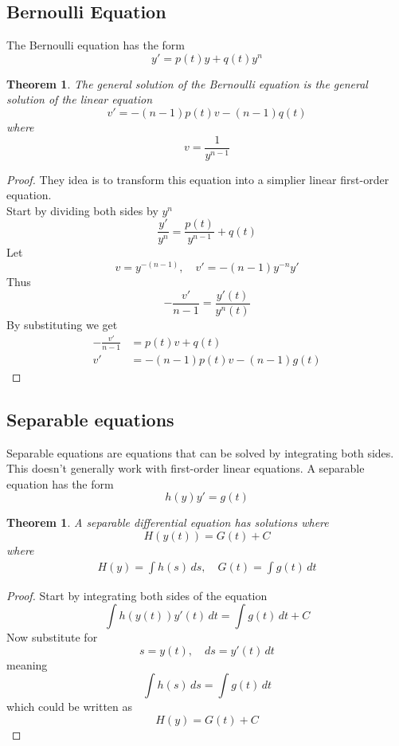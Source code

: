 \documentclass{article}
\newtheorem*{theorem5}{Theorem}
\newtheorem*{theorem6}{Theorem}
\begin{document}
\pagebreak

\subsection{Bernoulli Equation}

The Bernoulli equation has the form
\[
    y' = p(t)y + q(t)y^n
\]

\begin{theorem5}
    The general solution of the Bernoulli equation is the general
    solution of the linear equation
    \[
        v' = -(n-1)p(t)v-(n-1)q(t)
    \]
    where
    \[
        v = \frac{1}{y^{n-1}}
    \]
\end{theorem5}
\begin{proof}
    They idea is to transform this equation into a simplier
    linear first-order equation. \\
    Start by dividing both sides by \(y^n\)
    \[
        \frac{y'}{y^n} = \frac{p(t)}{y^{n-1}} + q(t)
    \]
    Let
    \[
        v = y^{-(n-1)}, 
        \quad
        v' = -(n-1)y^{-n}y'
    \]
    Thus
    \[
        -\frac{v'}{n-1} = \frac{y'(t)}{y^n(t)}
    \]
    By substituting we get
    \begin{align*}
        -\frac{v'}{n-1} &= p(t)v + q(t) \\
        v' &= -(n-1)p(t)v-(n-1)g(t)
    \end{align*}
\end{proof}

\pagebreak

\subsection{Separable equations}

Separable equations are equations that can be solved by integrating both sides.
This doesn't generally work with first-order linear equations.
A separable equation has the form
\[
    h(y)y'=g(t)
\]
\begin{theorem6}
    A separable differential equation has solutions where
    \[
        H(y(t)) = G(t) + C
    \]
    where
    \begin{align*}
        H(y) = \int h(s)\,ds
        ,\quad
        G(t) = \int g(t)\,dt
    \end{align*}
\end{theorem6}
\begin{proof}
    Start by integrating both sides of the equation
    \[
        \int h(y(t))y'(t)\,dt =
        \int g(t)\,dt + C
    \]
    Now substitute for
    \[
        s=y(t),
        \quad
        ds=y'(t)\,dt
    \]
    meaning
    \[
        \int h(s)\, ds = 
        \int g(t)\,dt
    \]
    which could be written as
    \[
        H(y) = G(t) + C
    \]
\end{proof}
\end{document}
